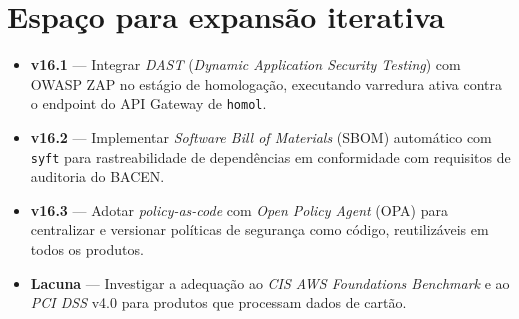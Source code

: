 \section{Espa\c{c}o para expans\~ao iterativa}

\begin{itemize}[leftmargin=*]
  \item \textbf{v16.1} --- Integrar \textit{DAST}
        (\textit{Dynamic Application Security Testing}) com OWASP ZAP
        no est\'agio de homologa\c{c}\~ao, executando varredura ativa
        contra o endpoint do API Gateway de \texttt{homol}.
  \item \textbf{v16.2} --- Implementar \textit{Software Bill of Materials}
        (SBOM) autom\'atico com \texttt{syft} para
        rastreabilidade de depend\^encias em conformidade com
        requisitos de auditoria do BACEN.
  \item \textbf{v16.3} --- Adotar \textit{policy-as-code}
        com \textit{Open Policy Agent} (OPA)
        para centralizar e versionar pol\'iticas de seguran\c{c}a como
        c\'odigo, reutiliz\'aveis em todos os produtos.
  \item \textbf{Lacuna} --- Investigar a adequa\c{c}\~ao ao
        \textit{CIS AWS Foundations Benchmark} e ao
        \textit{PCI DSS} v4.0 para produtos que processam dados de cart\~ao.
\end{itemize}
